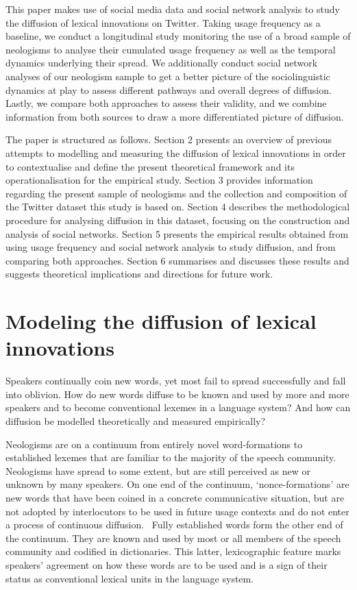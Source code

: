 \documentclass[draft, a4paper, abstract=on]{scrartcl}
\begin{document}
This paper makes use of social media data and social network analysis to study the diffusion of lexical innovations on Twitter. Taking usage frequency as a baseline, we conduct a longitudinal study monitoring the use of a broad sample of neologisms to analyse their cumulated usage frequency as well as the temporal dynamics underlying their spread. We additionally conduct social network analyses of our neologism sample to get a better picture of the sociolinguistic dynamics at play to assess different pathways and overall degrees of diffusion. Lastly, we compare both approaches to assess their validity, and we combine information from both sources to draw a more differentiated picture of diffusion.

The paper is structured as follows. Section 2 presents an overview of previous attempts to modelling and measuring the diffusion of lexical innovations in order to contextualise and define the present theoretical framework and its operationalisation for the empirical study. Section 3 provides information regarding the present sample of neologisms and the collection and composition of the Twitter dataset this study is based on. Section 4 describes the methodological procedure for analysing diffusion in this dataset, focusing on the construction and analysis of social networks. Section 5 presents the empirical results obtained from using usage frequency and social network analysis to study diffusion, and from comparing both approaches. Section 6 summarises and discusses these results and suggests theoretical implications and directions for future work.

\section{Modeling the diffusion of lexical innovations}

Speakers continually coin new words, yet most fail to spread successfully and fall into oblivion. How do new words diffuse to be known and used by more and more speakers and to become conventional lexemes in a language system? And how can diffusion be modelled theoretically and measured empirically?

Neologisms are on a continuum from entirely novel word-formations to established lexemes that are familiar to the majority of the speech community. Neologisms have spread to some extent, but are still perceived as new or unknown by many speakers. On one end of the continuum, `nonce-formations' are new words that have been coined in a concrete communicative situation, but are not adopted by interlocutors to be used in future usage contexts and do not enter a process of continuous diffusion.~\parencite{Hohenhaus1996AdhocwortbildungTerminologie} Fully established words form the other end of the continuum. They are known and used by most or all members of the speech community and codified in dictionaries. This latter, lexicographic feature marks speakers' agreement on how these words are to be used and is a sign of their status as conventional lexical units in the language system.
\end{document}
